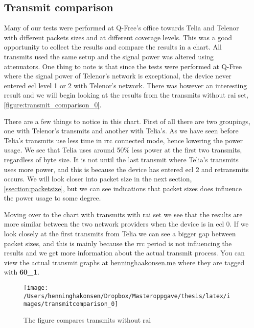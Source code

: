 \documentclass[USenglish]{ifimaster}  %
\begin{document}
\subsection{Transmit comparison}
Many of our tests were performed at Q-Free's office towards Telia and Telenor with different packets sizes and at different coverage levels. This was a good opportunity to collect the results and compare the results in a chart. All transmits used the same setup and the signal power was altered using attenuators. One thing to note is that since the tests were performed at Q-Free where the signal power of Telenor's network is exceptional, the device never entered \acrshort{ecl} level 1 or 2 with Telenor's network. There was however an interesting result and we will begin looking at the results from the transmits without \acrshort{rai} set, \vref{figure:transmit_comparison_0}.

There are a few things to notice in this chart. First of all there are two groupings, one with Telenor's transmits and another with Telia's. As we have seen before Telia's transmits use less time in \acrshort{rrc} connected mode, hence lowering the power usage. We see that Telia uses around 50\% less power at the first two transmits, regardless of byte size. It is not until the last transmit where Telia's transmits uses more power, and this is because the device has entered \acrshort{ecl} 2 and retransmits occurs.
We will look closer into packet size in the next section, \vref{ssection:packetsize}, but we can see indications that packet sizes does influence the power usage to some degree.

Moving over to the chart with transmits with \acrshort{rai} set we see that the results are more similar between the two network providers when the device is in \acrshort{ecl} 0. If we look closely at the first transmits from Telia we can see a bigger gap between packet sizes, and this is mainly because the \acrshort{rrc} period is not influencing the results and we get more information about the actual transmit process.
You can view the actual transmit graphs at \url{henninghaakonsen.me} where they are tagged with \textbf{60\_1}.

\begin{figure}[H]
  \centering\texttt{[image: /Users/henninghakonsen/Dropbox/Masteroppgave/thesis/latex/images/transmitcomparison\_0]}
  \caption[Short-term test - comparison without \acrshort{rai}]{The figure compares transmits without \acrshort{rai}}
  \label{figure:transmit_comparison_0}
\end{figure}
\end{document}
